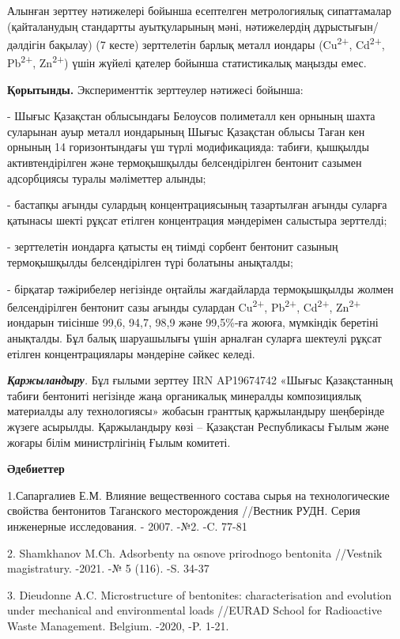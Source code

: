 Алынған зерттеу нәтижелері бойынша есептелген метрологиялық сипаттамалар
(қайталанудың стандартты ауытқуларының мәні, нәтижелердің
дұрыстығын/дәлдігін бақылау) (7 кесте) зерттелетін барлық металл иондары
(Cu\textsuperscript{2+}, Cd\textsuperscript{2+}, Pb\textsuperscript{2+},
Zn\textsuperscript{2+}) үшін жүйелі қателер бойынша статистикалық
маңызды емес.

\textbf{Қорытынды.} Эксперименттік зерттеулер нәтижесі бойынша:

- Шығыс Қазақстан облысындағы Белоусов полиметалл кен орнының шахта
суларынан ауыр металл иондарының Шығыс Қазақстан облысы Таған кен
орнының 14 горизонтындағы үш түрлі модификацияда: табиғи, қышқылды
активтендірілген және термоқышқылды белсендірілген бентонит сазымен
адсорбциясы туралы мәліметтер алынды;

- бастапқы ағынды сулардың концентрациясының тазартылған ағынды суларға
қатынасы шекті рұқсат етілген концентрация мәндерімен салыстыра
зерттелді;

- зерттелетін иондарға қатысты ең тиімді сорбент бентонит сазының
термоқышқылды белсендірілген түрі болатыны анықталды;

- бірқатар тәжірибелер негізінде оңтайлы жағдайларда термоқышқылды
жолмен белсендірілген бентонит сазы ағынды сулардан
Cu\textsuperscript{2+}, Pb\textsuperscript{2+}, Cd\textsuperscript{2+},
Zn\textsuperscript{2+} иондарын тиісінше 99,6, 94,7, 98,9 және 99,5\%-ға
жоюға, мүмкіндік беретіні анықталды. Бұл балық шаруашылығы үшін арналған
суларға шектеулі рұқсат етілген концентрациялары мәндеріне сәйкес
келеді.

\emph{\textbf{Қаржыландыру}.} Бұл ғылыми зерттеу IRN AP19674742 «Шығыс
Қазақстанның табиғи бентониті негізінде жаңа органикалық минералды
композициялық материалды алу технологиясы» жобасын гранттық қаржыландыру
шеңберінде жүзеге асырылды. Қаржыландыру көзі -- Қазақстан Республикасы
Ғылым және жоғары білім министрлігінің Ғылым комитеті.

\textbf{Әдебиеттер}

1.Сапаргалиев Е.М. Влияние вещественного состава сырья на
технологические свойства бентонитов Таганского месторождения //Вестник
РУДН. Серия инженерные исследования. - 2007. -№2. -C. 77-81

2. Shamkhanov M.Ch. Adsorbenty na osnove prirodnogo bentonita //Vestnik
magistratury. -2021. -№ 5 (116). -S. 34-37

3. Dieudonne A.C. Microstructure of bentonites: characterisation and
evolution under mechanical and environmental loads //EURAD School for
Radioactive Waste Management. Belgium. -2020, -P. 1-21.

